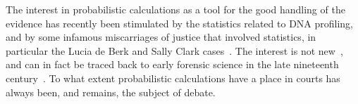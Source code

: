 \documentclass[10pt]{article}
\begin{document}

%
%
%



The interest in probabilistic calculations as a tool for the good handling of the evidence has recently been stimulated by the statistics related to DNA profiling, and by some infamous miscarriages of justice that involved statistics, in particular the Lucia de Berk and Sally Clark cases~\citep{dawidEtal2011,fenton2011,schnepsColmez2013}. The interest is not new~\citep{tillers2011}, and can in fact be traced back to early forensic science in the late nineteenth century~\citep{taroniEtal1998}. To what extent probabilistic calculations have a place in courts has always been, and remains, the subject of debate.
\end{document}
